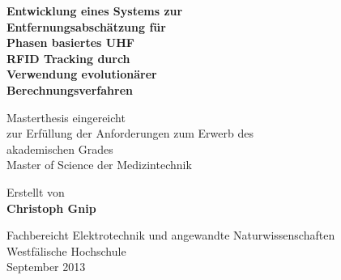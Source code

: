 
\begin{titlepage}
       \begin{center}
			{
			\Huge 
			\textbf{
			  Entwicklung eines Systems zur\\
			  Entfernungsabschätzung für\\
			  Phasen basiertes UHF \\
			  RFID Tracking durch \\
			  Verwendung evolutionärer\\
			  Berechnungsverfahren
			}\par
			}
			\vspace{3cm}
			{
			\Large Masterthesis eingereicht \\
			zur Erfüllung der Anforderungen 
			zum Erwerb des \\
			akademischen Grades\\
			Master of Science der Medizintechnik\\
			}
\vspace{2cm}

\large{Erstellt von}\\

\Large{\textbf{Christoph Gnip}}


\vfill

{\normalsize Fachbereicht Elektrotechnik und angewandte Naturwissenschaften
           \\Westfälische Hochschule\\[2ex]September 2013}


       \end{center}
   \end{titlepage}

\newpage
{}
\thispagestyle{empty}
\hspace{1cm}

\newpage
\normalsize



